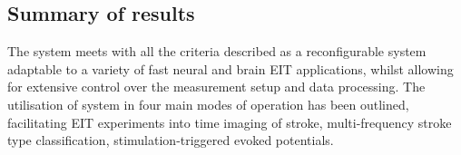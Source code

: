 \subsection{Summary of results}
The system meets with all the criteria described as a reconfigurable system adaptable to a variety of fast neural and brain EIT applications, whilst allowing for extensive control over the measurement setup and data processing. The utilisation of system in four main modes of operation has been outlined, facilitating EIT experiments into time imaging of stroke, multi-frequency stroke type classification, stimulation-triggered evoked potentials. 